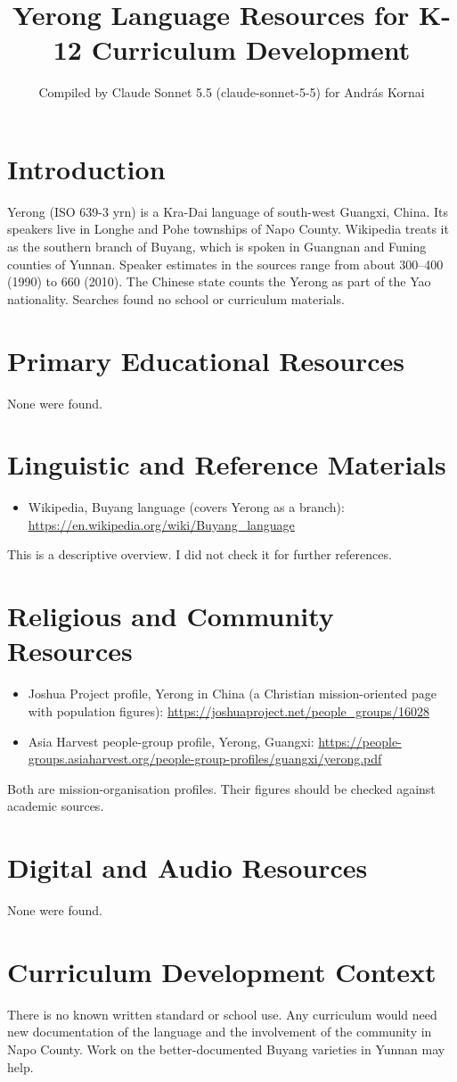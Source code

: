 \documentclass[12pt]{article}
\title{Yerong Language Resources for K-12 Curriculum Development}
\author{Compiled by Claude Sonnet 5.5 (claude-sonnet-5-5) for Andr\'as Kornai}
\date{}
\begin{document}
\maketitle

\section{Introduction}
Yerong (ISO 639-3 yrn) is a Kra-Dai language of south-west Guangxi, China. Its speakers live in Longhe and Pohe townships of Napo County. Wikipedia treats it as the southern branch of Buyang, which is spoken in Guangnan and Funing counties of Yunnan. Speaker estimates in the sources range from about 300--400 (1990) to 660 (2010). The Chinese state counts the Yerong as part of the Yao nationality. Searches found no school or curriculum materials.

\section{Primary Educational Resources}
None were found.

\section{Linguistic and Reference Materials}
\begin{itemize}
\item Wikipedia, Buyang language (covers Yerong as a branch): \url{https://en.wikipedia.org/wiki/Buyang_language}
\end{itemize}
This is a descriptive overview. I did not check it for further references.

\section{Religious and Community Resources}
\begin{itemize}
\item Joshua Project profile, Yerong in China (a Christian mission-oriented page with population figures): \url{https://joshuaproject.net/people_groups/16028}
\item Asia Harvest people-group profile, Yerong, Guangxi: \url{https://people-groups.asiaharvest.org/people-group-profiles/guangxi/yerong.pdf}
\end{itemize}
Both are mission-organisation profiles. Their figures should be checked against academic sources.

\section{Digital and Audio Resources}
None were found.

\section{Curriculum Development Context}
There is no known written standard or school use. Any curriculum would need new documentation of the language and the involvement of the community in Napo County. Work on the better-documented Buyang varieties in Yunnan may help.
\end{document}
